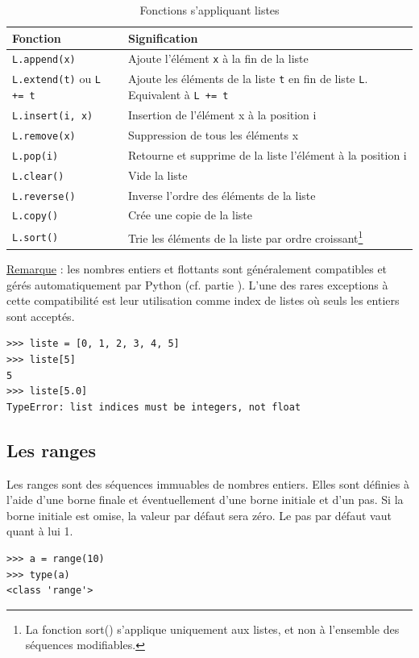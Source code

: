 \documentclass[12pt, a4paper]{article}
\begin{document}
\begin{table}[H]
	\begin{center}
		\begin{tabular}{|l|p{11cm}|}
			\hline
			\textbf{Fonction} & \textbf{Signification} \\
			\hline
			\lstinline{L.append(x)} & Ajoute l'élément \lstinline{x} à la fin de la liste \\
			\lstinline{L.extend(t)} ou \lstinline{L += t} & Ajoute les éléments de la liste \lstinline{t} en fin de liste \lstinline{L}. Equivalent à \lstinline{L += t} \\
			\lstinline{L.insert(i, x)} & Insertion de l'élément x à la position i \\
			\lstinline{L.remove(x)} & Suppression de tous les éléments x \\
			\lstinline{L.pop(i)} & Retourne et supprime de la liste l'élément à la position i \\
			\lstinline{L.clear()} & Vide la liste \\
			\lstinline{L.reverse()} & Inverse l'ordre des éléments de la liste \\
			\lstinline{L.copy()} & Crée une copie de la liste \\
			\lstinline{L.sort()} & Trie les éléments de la liste par ordre croissant\footnote{La fonction sort() s'applique uniquement aux listes, et non à l'ensemble des séquences modifiables.} \\
			\hline
		\end{tabular}
		\caption{Fonctions s'appliquant listes}
		\label{tab:fonctions_listes}
	\end{center}
\end{table}


\underline{Remarque} : les nombres entiers et flottants sont généralement compatibles et gérés automatiquement par Python (cf. partie \label{sec:types_numeriques}). L'une des rares exceptions à cette compatibilité est leur utilisation comme index de listes où seuls les entiers sont acceptés.
\begin{lstlisting}
>>> liste = [0, 1, 2, 3, 4, 5]
>>> liste[5]
5
>>> liste[5.0]
TypeError: list indices must be integers, not float
\end{lstlisting}


\subsection{Les ranges}
Les ranges sont des séquences immuables de nombres entiers. Elles sont définies à l'aide d'une borne finale et éventuellement d'une borne initiale et d'un pas. Si la borne initiale est omise, la valeur par défaut sera zéro. Le pas par défaut vaut quant à lui 1.
\begin{lstlisting}
>>> a = range(10)
>>> type(a)
<class 'range'>
\end{lstlisting}
\end{document}
